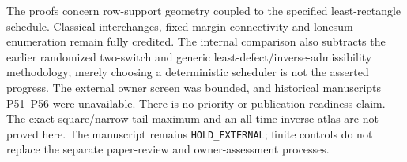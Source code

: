 \documentclass[a4paper,10pt]{amsart}
\theoremstyle{remark}
\begin{document}
The proofs concern row-support geometry coupled to the specified
least-rectangle schedule. Classical interchanges, fixed-margin
connectivity and lonesum enumeration remain fully credited. The internal
comparison also subtracts the earlier randomized two-switch and generic
least-defect/inverse-admissibility methodology; merely choosing a
deterministic scheduler is not the asserted progress.
The external owner screen was bounded, and historical manuscripts
P51--P56 were unavailable. There is no priority or publication-readiness
claim. The exact square/narrow tail maximum and an all-time inverse
atlas are not proved here. The manuscript remains
\texttt{HOLD\_EXTERNAL}; finite controls do not replace the separate
paper-review and owner-assessment processes.



\end{document}
